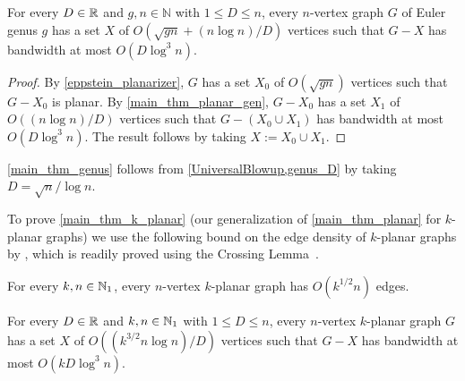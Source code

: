 \documentclass{patmorin}
\renewcommand{\leq}{\leqslant}
\newcommand{\NN}{\mathbb{N}}
\begin{document}
\begin{lem}
\label{genus_D}
For every $D\in\mathbb{R}$ and $g,n\in\NN$ with $1\leq D\leq n$, every $n$-vertex graph $G$ of Euler genus $g$ has a set $X$ of $O(\sqrt{gn}+(n\log n)/D)$ vertices such that $G-X$ has bandwidth at most $O(D\log^3 n)$.
\end{lem}

\begin{proof}
By \cref{eppstein_planarizer}, $G$ has a set $X_0$ of $O(\sqrt{gn})$ vertices such that $G-X_0$ is planar.  By \cref{main_thm_planar_gen}, $G-X_0$ has a set $X_1$ of $O((n\log n)/D)$ vertices such that $G-(X_0\cup X_1)$ has bandwidth at most $O(D\log^3 n)$. The result follows by taking $X:=X_0\cup X_1$.
\end{proof}

\cref{main_thm_genus} follows from \cref{UniversalBlowup,genus_D} by taking $D=\sqrt{n}/\log n$.

To prove \cref{main_thm_k_planar} (our generalization of \cref{main_thm_planar} for $k$-planar graphs) we use the following bound on the edge density of $k$-planar graphs by \citet{PachToth97}, which is readily proved using the Crossing Lemma~\cite{ajtai.chvatal.ea:crossing_free}.

\begin{lem}
\label{k_planar_density}
For every $k,n\in\mathbb{N}_1$, every $n$-vertex $k$-planar graph has $O(k^{1/2} n)$ edges.
\end{lem}



\begin{lem}\label{k_planar_D}
For every $D\in\mathbb{R}$ and $k,n\in\mathbb{N}_1$ with $1\leq D\leq n$, every $n$-vertex $k$-planar graph $G$ has a set $X$ of $O((k^{3/2}n\log n)/D)$ vertices such that $G-X$ has bandwidth at most $O(kD\log^3 n)$.
\end{lem}
\end{document}
